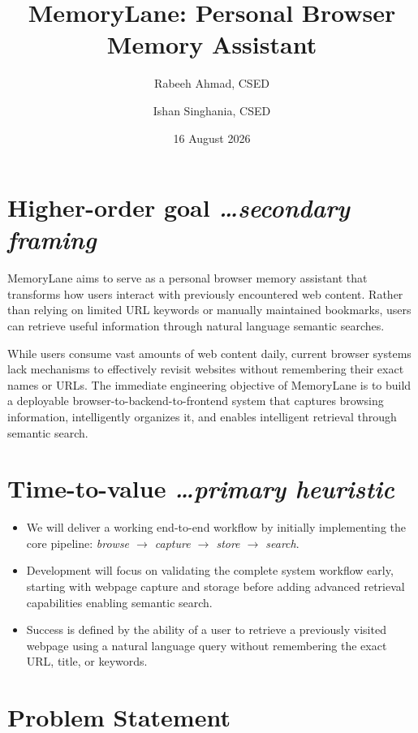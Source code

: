 \documentclass[11pt,a4paper]{article}
\title{MemoryLane: Personal Browser Memory Assistant}
\author{
  Rabeeh Ahmad, CSED%
  \and 
  Ishan Singhania, CSED%
}
\date{16 August 2026}
\newcommand{\BvrHint}[1]{%
  {\normalfont\normalsize\itshape\hfill #1}}
\begin{document}
\maketitle

\section{Higher-order goal%
  \BvrHint{\ldots secondary framing}}

MemoryLane aims to serve as a personal browser memory assistant that transforms how users interact with previously encountered web content. Rather than relying on limited URL keywords or manually maintained bookmarks, users can retrieve useful information through natural language semantic searches. 

While users consume vast amounts of web content daily, current browser systems lack mechanisms to effectively revisit websites without remembering their exact names or URLs. The immediate engineering objective of MemoryLane is to build a deployable browser-to-backend-to-frontend system that captures browsing information, intelligently organizes it, and enables intelligent retrieval through semantic search.


\section{Time-to-value %
  \BvrHint{\ldots primary heuristic}}

\begin{itemize}[leftmargin=0.7cm]

\item We will deliver a working end-to-end workflow by initially implementing the core pipeline:
\textit{browse $\rightarrow$ capture $\rightarrow$ store $\rightarrow$ search}.

\item Development will focus on validating the complete system workflow early, starting with webpage capture and storage before adding advanced retrieval capabilities enabling semantic search.

\item Success is defined by the ability of a user to retrieve a previously visited webpage using a natural language query without remembering the exact URL, title, or keywords.

\end{itemize}


\section{Problem Statement}
\end{document}

